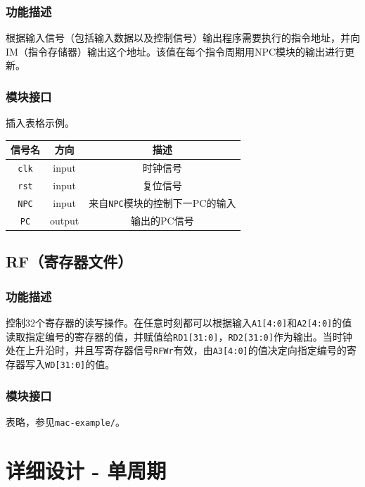 \documentclass[UTF8,a4paper,autofakebold,15pt]{ctexart}
\begin{document}
\subsubsection{功能描述}

	根据输入信号（包括输入数据以及控制信号）输出程序需要执行的指令地址，并向IM（指令存储器）输出这个地址。该值在每个指令周期用NPC模块的输出进行更新。

\subsubsection{模块接口}
	插入表格示例。

	\begin{center}

	\begin{tabular}{|c|c|c|}
		\hline
		信号名&方向&描述\\
		\hline
		{\tt clk}&input&时钟信号\\
		\hline
		{\tt rst}&input&复位信号\\
		\hline
		{\tt NPC}&input&来自{\tt NPC}模块的控制下一PC的输入\\
		\hline
		{\tt PC}&output&输出的PC信号\\
		\hline
	\end{tabular}

	\end{center}

\subsection{RF（寄存器文件）}

\subsubsection{功能描述}

	控制32个寄存器的读写操作。在任意时刻都可以根据输入{\tt A1[4:0]}和{\tt A2[4:0]}的值读取指定编号的寄存器的值，并赋值给{\tt RD1[31:0]}，{\tt RD2[31:0]}作为输出。当时钟处在上升沿时，并且写寄存器信号{\tt RFWr}有效，由{\tt A3[4:0]}的值决定向指定编号的寄存器写入{\tt WD[31:0]}的值。

\subsubsection{模块接口}

	表略，参见{\tt mac-example/}。

\newpage
\section{详细设计 - 单周期}
\end{document}
